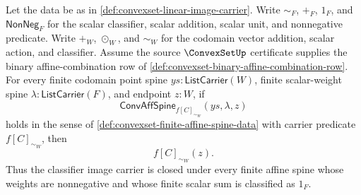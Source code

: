 \begin{theorem}
\label{thm:convexset-linear-image-finite-affine-spine-closure}
Let the data be as in \autoref{def:convexset-linear-image-carrier}. Write $\sim_F$, $+_F$, $1_F$, and $\mathsf{NonNeg}_F$ for the scalar classifier, scalar addition, scalar unit, and nonnegative predicate. Write $+_W$, $\odot_W$, and $\sim_W$ for the codomain vector addition, scalar action, and classifier. Assume the source $\ConvexSetUp$ certificate supplies the binary affine-combination row of \autoref{def:convexset-binary-affine-combination-row}. For every finite codomain point spine $ys:\mathsf{ListCarrier}(W)$, finite scalar-weight spine $\lambda:\mathsf{ListCarrier}(F)$, and endpoint $z:W$, if
$$
\mathsf{ConvAffSpine}_{f[C]_{\sim_W}}(ys,\lambda,z)
$$
holds in the sense of \autoref{def:convexset-finite-affine-spine-data} with carrier predicate $f[C]_{\sim_W}$, then
$$
f[C]_{\sim_W}(z).
$$
Thus the classifier image carrier is closed under every finite affine spine whose weights are nonnegative and whose finite scalar sum is classified as $1_F$.
\end{theorem}
